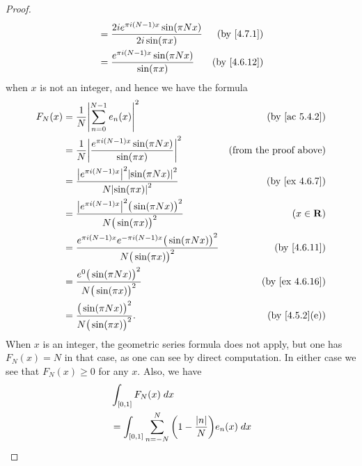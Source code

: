 \begin{proof}
\begin{align*}
                                & = \frac{2i e^{\pi i (N - 1) x} \sin(\pi N x)}{2i \sin(\pi x)}                                                           & \text{(by \cref{4.7.1})}     \\
                                & = \frac{e^{\pi i (N - 1) x} \sin(\pi N x)}{\sin(\pi x)}                                                                 & \text{(by \cref{4.6.12})}
  \end{align*}
  when \(x\) is not an integer, and hence we have the formula
  \begin{align*}
    F_N(x) & = \frac{1}{N} \abs{\sum_{n = 0}^{N - 1} e_n(x)}^2                                                       & \text{(by \cref{ac 5.4.2})}   \\
           & = \frac{1}{N} \abs{\frac{e^{\pi i (N - 1) x} \sin(\pi N x)}{\sin(\pi x)}}^2                             & \text{(from the proof above)} \\
           & = \frac{\abs{e^{\pi i (N - 1) x}}^2 \abs{\sin(\pi N x)}^2}{N \abs{\sin(\pi x)}^2}                       & \text{(by \cref{ex 4.6.7})}   \\
           & = \frac{\abs{e^{\pi i (N - 1) x}}^2 \big(\sin(\pi N x)\big)^2}{N \big(\sin(\pi x)\big)^2}               & (x \in \R)                    \\
           & = \frac{e^{\pi i (N - 1) x} e^{- \pi i (N - 1) x} \big(\sin(\pi N x)\big)^2}{N \big(\sin(\pi x)\big)^2} & \text{(by \cref{4.6.11})}     \\
           & = \frac{e^0 \big(\sin(\pi N x)\big)^2}{N \big(\sin(\pi x)\big)^2}                                       & \text{(by \cref{ex 4.6.16})}  \\
           & = \frac{\big(\sin(\pi N x)\big)^2}{N \big(\sin(\pi x)\big)^2}.                                          & \text{(by \cref{4.5.2}(e))}
  \end{align*}
  When \(x\) is an integer, the geometric series formula does not apply, but one has \(F_N(x) = N\) in that case, as one can see by direct computation.
  In either case we see that \(F_N(x) \geq 0\) for any \(x\).
  Also, we have
  \begin{align*}
     & \int_{[0, 1]} F_N(x) \; dx                                                                                                                           \\
     & = \int_{[0, 1]} \sum_{n = -N}^N \bigg(1 - \frac{\abs{n}}{N}\bigg) e_n(x) \; dx                                                                       \\

\end{align*}
\end{proof}
